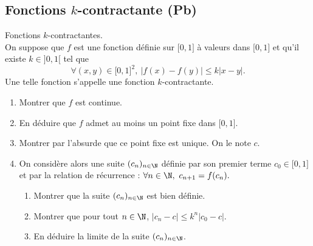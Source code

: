 \subsection{Fonctions $k$-contractante (Pb)}

\begin{exercice}  \;
Fonctions $k$-contractantes.\\
\noindent On suppose que $f$ est une fonction d\'efinie sur $\lbrack 0,1\rbrack$ \`a valeurs dans $\lbrack 0,1\rbrack$ et qu'il existe $k\in\rbrack 0,1\lbrack$ tel que
$$\forall (x,y)\in\lbrack 0,1\rbrack^2,\ |f(x)-f(y)|\leq k|x-y|.$$
Une telle fonction s'appelle une fonction $k$-contractante.
\begin{enumerate}
\item Montrer que $f$ est continue. 
\item En déduire que $f$ admet au moins un point fixe dans $\lbrack 0,1\rbrack$. 
\item Montrer par l'absurde que ce point fixe est unique. On le note $c$.  

\item 
On consid\`ere alors une suite $(c_n)_{n\in\N}$ d\'efinie par son premier terme $c_0\in\lbrack 0,1\rbrack$ et par la relation de r\'ecurrence  : $\forall n\in\N,\ c_{n+1}=f(c_n).$
\begin{enumerate}
\item Montrer que la suite $(c_n)_{n\in\N}$ est bien d\'efinie.
\item Montrer que pour tout $n\in\N$, $|c_n-c|\leq k^n|c_0-c|$. 
\item En d\'eduire la limite de la suite $(c_n)_{n\in\N}$.
\end{enumerate}
\end{enumerate}
\end{exercice}


